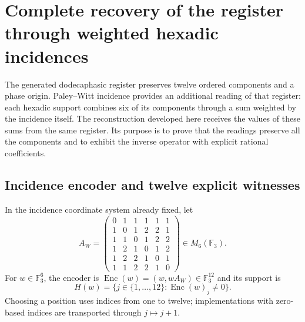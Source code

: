 
\section[Recovery through hexadic incidences]{Complete recovery of the register through weighted hexadic incidences}
\label{rh:sec:recuperacion}

The generated dodecaphasic register preserves twelve ordered components and
a phase origin. Paley--Witt incidence provides an additional
reading of that register: each hexadic support combines six of its
components through a sum weighted by the incidence itself. The
reconstruction developed here receives the values of these sums
from the same register. Its purpose is to prove that the readings preserve
all the components and to exhibit the inverse operator with explicit
rational coefficients.

\subsection{Incidence encoder and twelve explicit witnesses}

In the incidence coordinate system already fixed, let
\[
A_W=\begin{pmatrix}
0&1&1&1&1&1\\1&0&1&2&2&1\\1&1&0&1&2&2\\
1&2&1&0&1&2\\1&2&2&1&0&1\\1&1&2&2&1&0
\end{pmatrix}\in M_6(\mathbb F_3).
\]
For $w\in\mathbb F_3^6$, the encoder is
$\operatorname{Enc}(w)=(w,wA_W)\in\mathbb F_3^{12}$ and its support
is
\[
H(w)=\{j\in\{1,\ldots,12\}:\operatorname{Enc}(w)_j\ne0\}.
\]
Choosing a position uses indices from one to twelve;
implementations with zero-based indices are transported through
$j\mapsto j+1$.

